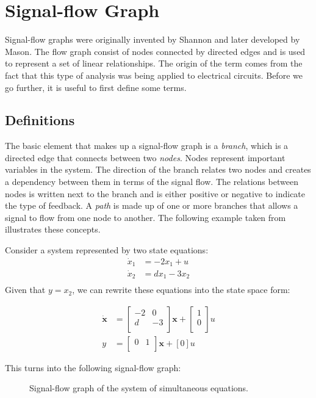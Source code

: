 \section{Signal-flow Graph}

Signal-flow graphs were originally invented by Shannon and
later developed by Mason. The flow graph consist of nodes connected by
directed edges and is used to represent a set of linear
relationships. The origin of the term comes from the fact that this
type of analysis was being applied to electrical circuits. Before we
go further, it is useful to first define some terms.

\subsection{Definitions}

The basic element that makes up a signal-flow graph is a
\textit{branch}, which is a directed edge that connects between two
\textit{nodes}. Nodes represent important variables in the system. The
direction of the branch relates two nodes and creates a dependency
between them in terms of the signal flow. The relations between nodes
is written next to the branch and is either positive or negative to
indicate the type of feedback. A \textit{path} is made up of one or
more branches that allows a signal to flow from one node to
another. The following example taken from \cite{dorf_modern_2011}
illustrates these concepts.

\noindent Consider a system represented by two state equations:
\begin{align*}
  \dot x_1 &= -2x_1 + u \\
  \dot x_2 &= dx_1 - 3x_2 \\
\end{align*}
Given that $y = x_2$, we can rewrite these equations into the
state space form:

\begin{align*}
  \mathbf{\dot x} &=
  \begin{bmatrix}
    -2 & 0 \\
    d & -3 \\
  \end{bmatrix}
  \mathbf{x} +
  \begin{bmatrix}
    1 \\
    0 \\
  \end{bmatrix}
  u \\
  y &=
  \begin{bmatrix}
    0 & 1 \\
  \end{bmatrix}
  \mathbf{x} +
  [0] u
\end{align*}

This turns into the following signal-flow graph:

\begin{figure}[h]
  \caption{Signal-flow graph of the system of simultaneous equations.}
  \label{fig:signalflowgraph1}
\end{figure}

